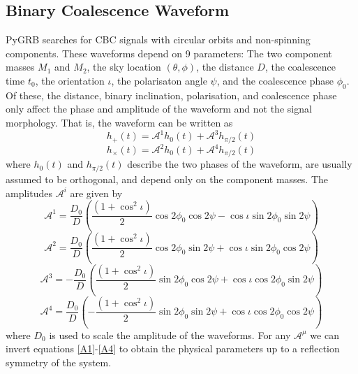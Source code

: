 \documentclass[12pt,twoside,a4paper]{report}
\begin{document}
\subsection{Binary Coalescence Waveform}
PyGRB searches for CBC signals with circular orbits and non-spinning components. These waveforms depend on 9 parameters: The two component masses $M_1$ and $M_2$, the sky location $(\theta, \phi)$, the distance $D$, the coalescence time $t_0$, the orientation $\iota$, the polarisaton angle $\psi$, and the coalescence phase $\phi_0$. Of these, the distance, binary inclination, polarisation, and coalescence phase only affect the phase and amplitude of the waveform and not the signal morphology. That is, the waveform can be written as
\begin{equation} \label{hp}
h_+(t) = \mathcal{A}^1 h_0(t) + \mathcal{A}^3 h_{\pi/2}(t)
\end{equation}
\begin{equation} \label{hx}
h_\times(t) = \mathcal{A}^2 h_0(t) + \mathcal{A}^4 h_{\pi/2}(t)
\end{equation}
where $h_0(t)$ and $h_{\pi/2}(t)$ describe the two phases of the waveform, are usually assumed to be orthogonal, and depend only on the component masses. The amplitudes $\mathcal{A}^i$ are given by 
\begin{equation} \label{A1}
\mathcal{A}^1 = \frac{D_0}{D} \left( \frac{(1+\cos^2 \iota)}{2} \cos 2\phi_0 \cos 2\psi -  \cos \iota \sin 2 \phi_0 \sin 2\psi \right)
\end{equation}
\begin{equation}
\mathcal{A}^2 = \frac{D_0}{D} \left( \frac{(1+\cos^2 \iota)}{2} \cos 2\phi_0 \sin 2\psi +  \cos \iota \sin 2 \phi_0 \cos 2\psi \right)
\end{equation}
\begin{equation}
\mathcal{A}^3 = -\frac{D_0}{D} \left( \frac{(1+\cos^2 \iota)}{2} \sin 2\phi_0 \cos 2\psi +  \cos \iota \cos 2 \phi_0 \sin 2\psi \right)
\end{equation}
\begin{equation} \label{A4}
\mathcal{A}^4 = \frac{D_0}{D} \left( -\frac{(1+\cos^2 \iota)}{2} \sin 2\phi_0 \sin 2\psi +  \cos \iota \cos 2 \phi_0 \cos 2\psi \right)
\end{equation}
where $D_0$ is used to scale the amplitude of the waveforms. For any $\mathcal{A}^\mu$ we can invert equations \ref{A1}-\ref{A4} to obtain the physical parameters up to a reflection symmetry of the system. 
\end{document}
